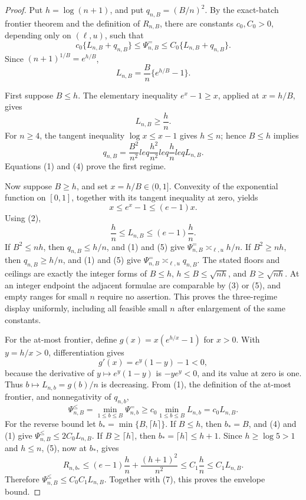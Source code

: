 \documentclass{article}
\begin{document}
\begin{proof}
Put \(h=\log(n+1)\), and put \(q_{n,B}=(B/n)^2\). By the exact-batch frontier theorem and the definition of \(R_{n,B}\), there are constants \(c_0,C_0>0\), depending only on \((\ell,u)\), such that
\[
c_0\{L_{n,B}+q_{n,B}\}
\leq \Psi^{=}_{n,B}
\leq C_0\{L_{n,B}+q_{n,B}\}.                    \tag{1}
\]
Since \((n+1)^{1/B}=e^{h/B}\),
\[
L_{n,B}=\frac{B}{n}\{e^{h/B}-1\}.               \tag{2}
\]

First suppose \(B\leq h\). The elementary inequality \(e^x-1\geq x\), applied at \(x=h/B\), gives
\[
L_{n,B}\geq \frac{h}{n}.                         \tag{3}
\]
For \(n\geq4\), the tangent inequality \(\log x\leq x-1\) gives \(h\leq n\); hence \(B\leq h\) implies
\[
q_{n,B}=\frac{B^2}{n^2}leq\frac{h^2}{n^2}leq\frac{h}{n}leq L_{n,B}. \tag{4}
\]
Equations (1) and (4) prove the first regime.

Now suppose \(B\geq h\), and set \(x=h/B\in(0,1]\). Convexity of the exponential function on \([0,1]\), together with its tangent inequality at zero, yields
\[
x\leq e^x-1\leq(e-1)x.
\]
Using (2),
\[
\frac{h}{n}\leq L_{n,B}\leq(e-1)\frac{h}{n}.     \tag{5}
\]
If \(B^2\leq nh\), then \(q_{n,B}\leq h/n\), and (1) and (5) give
\(\Psi^{=}_{n,B}\asymp_{\ell,u}h/n\). If \(B^2\geq nh\), then \(q_{n,B}\geq h/n\), and (1) and (5) give
\(\Psi^{=}_{n,B}\asymp_{\ell,u}q_{n,B}\). The stated floors and ceilings are exactly the integer forms of \(B\leq h\), \(h\leq B\leq\sqrt{nh}\), and \(B\geq\sqrt{nh}\). At an integer endpoint the adjacent formulae are comparable by (3) or (5), and empty ranges for small \(n\) require no assertion. This proves the three-regime display uniformly, including all feasible small \(n\) after enlargement of the same constants.

For the at-most frontier, define \(g(x)=x(e^{h/x}-1)\) for \(x>0\). With \(y=h/x>0\), differentiation gives
\[
g'(x)=e^y(1-y)-1<0,                               \tag{6}
\]
because the derivative of \(y\mapsto e^y(1-y)\) is \(-ye^y<0\), and its value at zero is one. Thus \(b\mapsto L_{n,b}=g(b)/n\) is decreasing. From (1), the definition of the at-most frontier, and nonnegativity of \(q_{n,b}\),
\[
\Psi^{\leq}_{n,B}
=\min_{1\leq b\leq B}\Psi^{=}_{n,b}
\geq c_0\min_{1\leq b\leq B}L_{n,b}
=c_0L_{n,B}.                                      \tag{7}
\]
For the reverse bound let \(b_* =\min\{B,\lceil h\rceil\}\). If \(B\leq h\), then \(b_*=B\), and (4) and (1) give
\(\Psi^{\leq}_{n,B}\leq 2C_0L_{n,B}\). If \(B\geq\lceil h\rceil\), then \(b_*=\lceil h\rceil\leq h+1\). Since \(h\geq\log5>1\) and \(h\leq n\), (5), now at \(b_*\), gives
\[
R_{n,b_*}
\leq(e-1)\frac{h}{n}+\frac{(h+1)^2}{n^2}
\leq C_1\frac{h}{n}
\leq C_1L_{n,B}.                                  \tag{8}
\]
Therefore \(\Psi^{\leq}_{n,B}\leq C_0C_1L_{n,B}\). Together with (7), this proves the envelope bound.


\end{proof}
\end{document}
